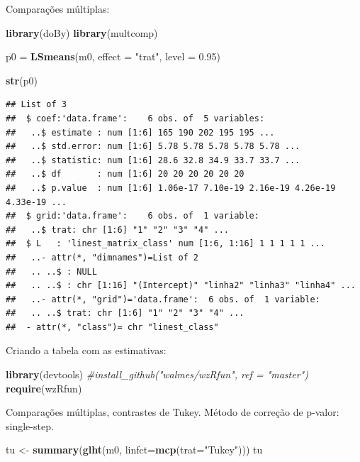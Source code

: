 \documentclass[
]{book}
\newenvironment{Shaded}{\begin{snugshade}}{\end{snugshade}}
\newcommand{\CommentTok}[1]{\textcolor[rgb]{0.56,0.35,0.01}{\textit{#1}}}
\newcommand{\DataTypeTok}[1]{\textcolor[rgb]{0.13,0.29,0.53}{#1}}
\newcommand{\FloatTok}[1]{\textcolor[rgb]{0.00,0.00,0.81}{#1}}
\newcommand{\KeywordTok}[1]{\textcolor[rgb]{0.13,0.29,0.53}{\textbf{#1}}}
\newcommand{\NormalTok}[1]{#1}
\newcommand{\StringTok}[1]{\textcolor[rgb]{0.31,0.60,0.02}{#1}}
\begin{document}
Comparações múltiplas:

\begin{Shaded}
\begin{Highlighting}[]
\KeywordTok{library}\NormalTok{(doBy) }
\KeywordTok{library}\NormalTok{(multcomp) }

\NormalTok{p0 =}\StringTok{ }\KeywordTok{LSmeans}\NormalTok{(m0, }\DataTypeTok{effect =} \StringTok{"trat"}\NormalTok{, }\DataTypeTok{level =} \FloatTok{0.95}\NormalTok{) }

\KeywordTok{str}\NormalTok{(p0)}
\end{Highlighting}
\end{Shaded}

\begin{verbatim}
## List of 3
##  $ coef:'data.frame':    6 obs. of  5 variables:
##   ..$ estimate : num [1:6] 165 190 202 195 195 ...
##   ..$ std.error: num [1:6] 5.78 5.78 5.78 5.78 5.78 ...
##   ..$ statistic: num [1:6] 28.6 32.8 34.9 33.7 33.7 ...
##   ..$ df       : num [1:6] 20 20 20 20 20 20
##   ..$ p.value  : num [1:6] 1.06e-17 7.10e-19 2.16e-19 4.26e-19 4.33e-19 ...
##  $ grid:'data.frame':    6 obs. of  1 variable:
##   ..$ trat: chr [1:6] "1" "2" "3" "4" ...
##  $ L   : 'linest_matrix_class' num [1:6, 1:16] 1 1 1 1 1 ...
##   ..- attr(*, "dimnames")=List of 2
##   .. ..$ : NULL
##   .. ..$ : chr [1:16] "(Intercept)" "linha2" "linha3" "linha4" ...
##   ..- attr(*, "grid")='data.frame':  6 obs. of  1 variable:
##   .. ..$ trat: chr [1:6] "1" "2" "3" "4" ...
##  - attr(*, "class")= chr "linest_class"
\end{verbatim}

Criando a tabela com as estimativas:

\begin{Shaded}
\begin{Highlighting}[]
\KeywordTok{library}\NormalTok{(devtools) }
\CommentTok{#install_github("walmes/wzRfun", ref = "master") }
\KeywordTok{require}\NormalTok{(wzRfun)}
\end{Highlighting}
\end{Shaded}

Comparações múltiplas, contrastes de Tukey. Método de correção de p-valor: single-step.

\begin{Shaded}
\begin{Highlighting}[]
\NormalTok{tu <-}\StringTok{ }\KeywordTok{summary}\NormalTok{(}\KeywordTok{glht}\NormalTok{(m0, }\DataTypeTok{linfct=}\KeywordTok{mcp}\NormalTok{(}\DataTypeTok{trat=}\StringTok{"Tukey"}\NormalTok{))) }
\NormalTok{tu}
\end{Highlighting}
\end{Shaded}
\end{document}
